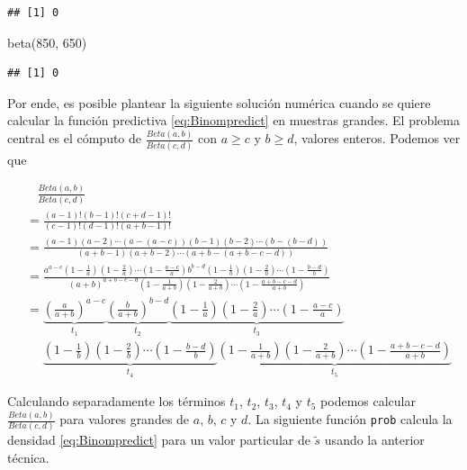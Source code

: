 \documentclass[
  10pt,
  spanish,
]{book}
\newenvironment{Shaded}{\begin{snugshade}}{\end{snugshade}}
\newcommand{\DecValTok}[1]{\textcolor[rgb]{0.00,0.00,0.81}{#1}}
\newcommand{\FunctionTok}[1]{\textcolor[rgb]{0.00,0.00,0.00}{#1}}
\newcommand{\NormalTok}[1]{#1}
\theoremstyle{definition}
\theoremstyle{definition}
\theoremstyle{definition}
\theoremstyle{definition}
\theoremstyle{remark}
\begin{document}
\begin{verbatim}
## [1] 0
\end{verbatim}

\begin{Shaded}
\begin{Highlighting}[]
\FunctionTok{beta}\NormalTok{(}\DecValTok{850}\NormalTok{, }\DecValTok{650}\NormalTok{)}
\end{Highlighting}
\end{Shaded}

\begin{verbatim}
## [1] 0
\end{verbatim}

Por ende, es posible plantear la
siguiente solución numérica cuando se quiere calcular la función
predictiva \eqref{eq:Binompredict} en muestras grandes. El problema
central es el cómputo de \(\frac{Beta(a,b)}{Beta(c,d)}\) con \(a \geq c\) y
\(b \geq d\), valores enteros. Podemos ver que

\begin{align*}
&\ \ \ \ \frac{Beta(a,b)}{Beta(c,d)}\\
&=\frac{(a-1)!(b-1)!(c+d-1)!}{(c-1)!(d-1)!(a+b-1)!}\\
&=\frac{(a-1)(a-2)\cdots(a-(a-c))(b-1)(b-2)\cdots(b-(b-d))}{(a+b-1)(a+b-2)\cdots(a+b-(a+b-c-d))}\\
&=\frac{a^{a-c}(1-\frac{1}{a})(1-\frac{2}{a})\cdots(1-\frac{a-c}{a})b^{b-d}(1-\frac{1}{b})(1-\frac{2}{b})\cdots(1-\frac{b-d}{b})}{(a+b)^{a+b-c-d}(1-\frac{1}{a+b})(1-\frac{2}{a+b})\cdots(1-\frac{a+b-c-d}{a+b})}\\
&=\underbrace{\left(\frac{a}{a+b}\right)^{a-c}}_{t_1}\underbrace{\left(\frac{b}{a+b}\right)^{b-d}}_{t_2}\underbrace{(1-\frac{1}{a})(1-\frac{2}{a})\cdots(1-\frac{a-c}{a})}_{t_3}\\
&\ \ \ \ \ \ \underbrace{(1-\frac{1}{b})(1-\frac{2}{b})\cdots(1-\frac{b-d}{b})}_{t_4}\underbrace{(1-\frac{1}{a+b})(1-\frac{2}{a+b})\cdots(1-\frac{a+b-c-d}{a+b})}_{t_5}
\end{align*}

Calculando separadamente los términos \(t_1\), \(t_2\), \(t_3\), \(t_4\) y \(t_5\)
podemos calcular \(\frac{Beta(a,b)}{Beta(c,d)}\) para valores grandes de
\(a\), \(b\), \(c\) y \(d\). La siguiente función \texttt{prob} calcula la
densidad \eqref{eq:Binompredict} para un valor particular de \(\tilde{s}\)
usando la anterior técnica.
\end{document}
